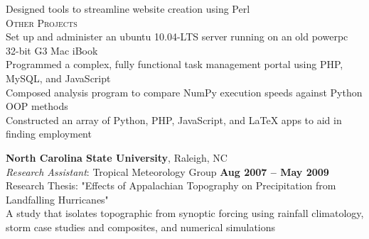 \documentclass[margin,line]{resume}
\begin{document}
\begin{resume}
Designed tools to streamline website creation using Perl
\vspace{2mm}\\
\textsc{Other Projects}\vspace{1mm}\\
Set up and administer an ubuntu 10.04-LTS server running on an old powerpc 32-bit G3 Mac iBook\vspace{0.3mm}\\
Programmed a complex, fully functional task management portal using PHP, MySQL, and JavaScript\vspace{0.3mm}\\
Composed analysis program to compare NumPy execution speeds against Python OOP methods\vspace{0.3mm}\\
Constructed an array of Python, PHP, JavaScript, and LaTeX apps to aid in finding employment


\textbf{North Carolina State University}, Raleigh, NC
\vspace{2mm}\\
\textsl{Research Assistant}: Tropical Meteorology Group \hfill \textbf{Aug 2007 -- May 2009}\vspace{1mm}\\
Research Thesis: "Effects of Appalachian Topography on Precipitation from Landfalling Hurricanes"\\
A study that isolates topographic from synoptic forcing using rainfall climatology, storm case studies and composites, and numerical simulations





\end{resume}
\end{document}
